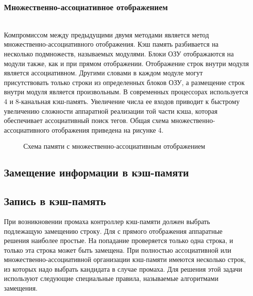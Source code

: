 \documentclass[13pt]{article}
\begin{document}
	\subsubsection{Множественно-ассоциативное отображением}\\
	    Компромиссом между предыдущими двумя методами является метод множественно-ассоциативного отображения. Кэш память разбивается на несколько подмножеств, называемых модулями. Блоки ОЗУ отображаются на модули также, как и при прямом отображении. Отображение строк внутри модуля является ассоциативном. Другими словами в каждом модуле могут присутствовать только строки из определенных блоков ОЗУ, а размещение строк внутри модуля является произвольным. В современных процессорах используется 4 и 8-канальная кэш-память. Увеличение числа ее входов приводит к быстрому увеличению сложности аппаратной реализации той части кэша, которая обеспечивает ассоциативный поиск тегов. Общая схема множественно-ассоциативного отображения приведена на рисунке 4.
	\begin{figure}[h!]
		\caption{Схема памяти с множественно-ассоциативным отображением}
	\end{figure}
	\newpage
	\newpage
	\subsection{Замещение информации в кэш-памяти}
	\subsection{Запись в кэш-память}
	При возникновении промаха контроллер кэш-памяти должен выбрать подлежащую замещению строку. Для с прямого отображения аппаратные решения наиболее простые. На попадание проверяется только одна строка, и только эта строка может быть замещена. При полностью ассоциативной или множественно-ассоциативной организации кэш-памяти имеются несколько строк, из которых надо выбрать кандидата в случае промаха. Для решения этой задачи используют следующие специальные правила, называемые алгоритмами замещения.
\end{document}
